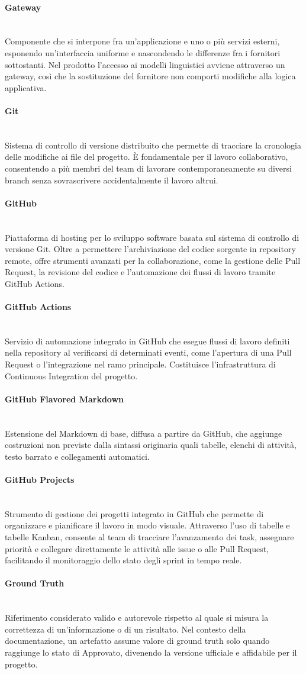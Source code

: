 \documentclass[a4paper, 10pt, colorlinks=true, linkcolor=black, urlcolor=blue, citecolor=blue, hidelinks]{article}
\newcommand{\glossaryterm}[2]{
    \paragraph{#1 \label{term:#1}} \mbox{} \\
    #2
    \vspace{0.5em}
}
\begin{document}
\glossaryterm{Gateway}{Componente che si interpone fra un'applicazione e uno o più servizi esterni, esponendo un'interfaccia uniforme e nascondendo le differenze fra i fornitori sottostanti. Nel prodotto l'accesso ai modelli linguistici avviene attraverso un gateway, così che la sostituzione del fornitore non comporti modifiche alla logica applicativa.}

\glossaryterm{Git}{Sistema di controllo di versione distribuito che permette di tracciare la cronologia delle modifiche ai file del progetto. È fondamentale per il lavoro collaborativo, consentendo a più membri del team di lavorare contemporaneamente su diversi branch senza sovrascrivere accidentalmente il lavoro altrui.}

\glossaryterm{GitHub}{Piattaforma di hosting per lo sviluppo software basata sul sistema di controllo di versione Git. Oltre a permettere l'archiviazione del codice sorgente in repository remote, offre strumenti avanzati per la collaborazione, come la gestione delle Pull Request, la revisione del codice e l'automazione dei flussi di lavoro tramite GitHub Actions.}

\glossaryterm{GitHub Actions}{Servizio di automazione integrato in GitHub che esegue flussi di lavoro definiti nella repository al verificarsi di determinati eventi, come l'apertura di una Pull Request o l'integrazione nel ramo principale. Costituisce l'infrastruttura di Continuous Integration del progetto.}

\glossaryterm{GitHub Flavored Markdown}{Estensione del Markdown di base, diffusa a partire da GitHub, che aggiunge costruzioni non previste dalla sintassi originaria quali tabelle, elenchi di attività, testo barrato e collegamenti automatici.}

\glossaryterm{GitHub Projects}{Strumento di gestione dei progetti integrato in GitHub che permette di organizzare e pianificare il lavoro in modo visuale. Attraverso l'uso di tabelle e tabelle Kanban, consente al team di tracciare l'avanzamento dei task, assegnare priorità e collegare direttamente le attività alle issue o alle Pull Request, facilitando il monitoraggio dello stato degli sprint in tempo reale.}

\glossaryterm{Ground Truth}{Riferimento considerato valido e autorevole rispetto al quale si misura la correttezza di un'informazione o di un risultato. Nel contesto della documentazione, un artefatto assume valore di ground truth solo quando raggiunge lo stato di Approvato, divenendo la versione ufficiale e affidabile per il progetto.}
\end{document}
